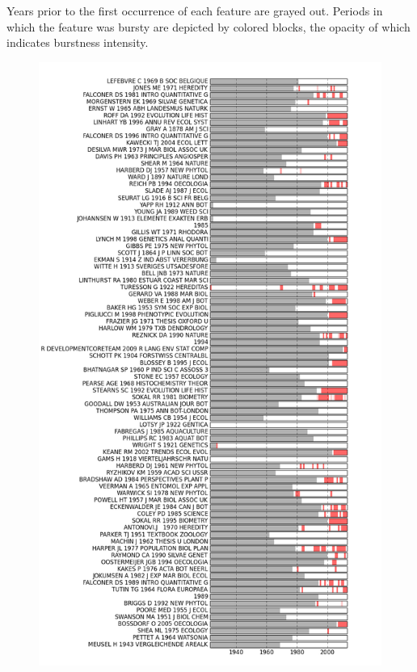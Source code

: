 \documentclass[letterpaper,10pt,english]{sphinxmanual}
\begin{document}
Years prior to the first occurrence of each feature are grayed out. Periods
in which the feature was bursty are depicted by colored blocks, the opacity
of which indicates burstness intensity.
\begin{figure}[htbp]
\centering

\includegraphics{burstness.png}
\end{figure}
\end{document}
